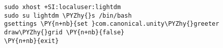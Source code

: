 \begin{Verbatim}[commandchars=\\\{\}]
sudo xhost +SI:localuser:lightdm
sudo su lightdm \PYZhy{}s /bin/bash
gsettings \PY{n+nb}{set }com.canonical.unity\PYZhy{}greeter draw\PYZhy{}grid \PY{n+nb}{false}
\PY{n+nb}{exit}
\end{Verbatim}
